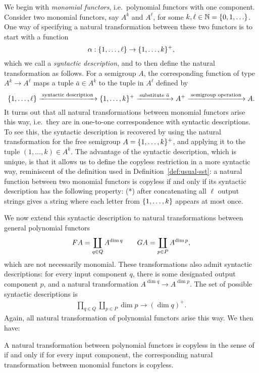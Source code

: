 We begin with \emph{monomial functors}, i.e.~polynomial functors with one component. 
Consider two monomial functors, say $A^k$ and $A^\ell$, for some  $k,\ell \in \mathbb{N} = \{0,1,\ldots\}$.
One way of specifying a natural transformation between these two functors is to start with a function 
\begin{equation}
\label{eq:syntactic-description}    \alpha : \{1,\ldots,\ell\} \to \{1,\ldots,k\}^+,
\end{equation}
which we call a \emph{syntactic description}, and to then  define the  natural transformation as follows. For a semigroup $A$, the corresponding function of type $A^k \to A^\ell$  maps a tuple $\bar a \in A^k$ to the tuple in $A^\ell$ defined by
\[
\{1,\ldots,\ell\}
\xrightarrow{\;\text{syntactic description}\;}
\{1,\ldots,k\}^+ 
\xrightarrow{\;\text{substitute $\bar a$}\;}
A^+
\xrightarrow{\;\text{semigroup operation}\;}
A.
\]
It turns out that all  natural transformations between monomial functors arise this way, i.e.~they are in one-to-one correspondence with syntactic descriptions. To see this, the syntactic description is recovered by using the natural transformation for the free semigroup $A=\{1,\ldots,k\}^+$, and applying it to the tuple $(1,\ldots,k) \in A^k$.
The advantage of the syntactic description, which is unique, is that it allows us to define the  {copyless restriction} in a more syntactic way, reminiscent of the definition used in Definition~\ref{def:usual-sst}:  a natural function between two monomial functors is copyless if and only if its syntactic description has the following property: (*) after concatenating all $\ell$ output strings gives a string where each letter from $\{1,\ldots,k\}$ appears at most once. 

We now extend this syntactic description to natural transformations between general polynomial functors 
\begin{align*}
\functor A = \coprod_{q \in Q} A^{\dim q} \qquad 
\functorg A = \coprod_{p \in P} A^{\dim p},
\end{align*}
which are not necessarily monomial. These transformations also admit syntactic descriptions: for every input component $q$, there is some designated output component $p$, and a natural transformation $A^{\dim q} \to A^{\dim p}$.  The set of possible syntactic descriptions is
\begin{align*}
\prod_{q \in Q} \coprod_{p \in P} \dim p \to (\dim q)^+.
\end{align*}
Again, all natural transformation of polynomial functors arise this way.
We then have:
\begin{claim}
  A natural transformation between polynomial functors is copyless in the sense of  if and only if for every input component, the corresponding natural transformation between monomial functors is copyless.
\end{claim}


